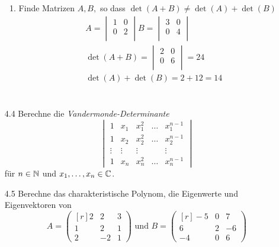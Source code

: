 \documentclass{HM}
\begin{document}
\begin{enumerate}
\begin{enumerate}
			\item Finde Matrizen $A,B,$ so dass $\det(A+B)\not=\det(A)+\det(B)$\\
			\begin{align*}
				A=\begin{vmatrix}
					1&0\\
					0&2\\
				\end{vmatrix}
				B=\begin{vmatrix}
					3&0\\
					0&4\\
				\end{vmatrix}\\
			\det(A+B)  = \begin{vmatrix}
				2&0\\
				0&6\\
			\end{vmatrix}= 24\\
			\det(A) + \det(B) = 2 + 12 = 14\\
			\end{align*}\\
		
		\end{enumerate}
		
	\item[4.4] Berechne die \textit{Vandermonde-Determinante}\\
		$$\begin{vmatrix}
			1&x_1&x_1^2&\hdots&x_1^{n-1}\\
			1&x_2&x_2^2&\hdots&x_2^{n-1}\\
			\vdots&\vdots&\vdots&&\vdots\\
			1&x_n&x_n^2&\hdots&x_n^{n-1}
		\end{vmatrix}$$
		für $n\in\mathbb{N}$ und $x_1,\hdots,x_n\in\mathbb{C}$.
		
	\item[4.5] Berechne das charakteristische Polynom, die Eigenwerte und Eigenvektoren von
	$$A=\begin{pmatrix*}[r]
		2&2&3\\
		1&2&1\\
		2&-2&1
	\end{pmatrix*} \text{ und } B=\begin{pmatrix*}[r]
		-5&0&7\\
		6&2&-6\\
		-4&0&6
	\end{pmatrix*}$$
	

\end{enumerate}
\end{document}
